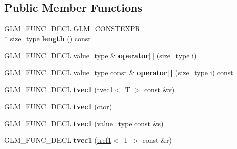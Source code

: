 \subsection*{Public Member Functions}
\begin{DoxyCompactItemize}
\item 
\hypertarget{structglm_1_1detail_1_1tvec1_a36558123300b2a66c51b62a17bee3657}{G\-L\-M\-\_\-\-F\-U\-N\-C\-\_\-\-D\-E\-C\-L G\-L\-M\-\_\-\-C\-O\-N\-S\-T\-E\-X\-P\-R \\*
size\-\_\-type {\bfseries length} () const }\label{structglm_1_1detail_1_1tvec1_a36558123300b2a66c51b62a17bee3657}

\item 
\hypertarget{structglm_1_1detail_1_1tvec1_a20e586dbb0fdfd345c66250a776b1246}{G\-L\-M\-\_\-\-F\-U\-N\-C\-\_\-\-D\-E\-C\-L value\-\_\-type \& {\bfseries operator\mbox{[}$\,$\mbox{]}} (size\-\_\-type i)}\label{structglm_1_1detail_1_1tvec1_a20e586dbb0fdfd345c66250a776b1246}

\item 
\hypertarget{structglm_1_1detail_1_1tvec1_ad8458f51c2f212caf4f1a66ca507514b}{G\-L\-M\-\_\-\-F\-U\-N\-C\-\_\-\-D\-E\-C\-L value\-\_\-type const \& {\bfseries operator\mbox{[}$\,$\mbox{]}} (size\-\_\-type i) const }\label{structglm_1_1detail_1_1tvec1_ad8458f51c2f212caf4f1a66ca507514b}

\item 
\hypertarget{structglm_1_1detail_1_1tvec1_a223f0b0626a866f6d6eff1110623a20d}{G\-L\-M\-\_\-\-F\-U\-N\-C\-\_\-\-D\-E\-C\-L {\bfseries tvec1} (\hyperlink{structglm_1_1detail_1_1tvec1}{tvec1}$<$ T $>$ const \&v)}\label{structglm_1_1detail_1_1tvec1_a223f0b0626a866f6d6eff1110623a20d}

\item 
\hypertarget{structglm_1_1detail_1_1tvec1_a6a152450aeaad0f0f87e5bc3f8b0bf84}{G\-L\-M\-\_\-\-F\-U\-N\-C\-\_\-\-D\-E\-C\-L {\bfseries tvec1} (ctor)}\label{structglm_1_1detail_1_1tvec1_a6a152450aeaad0f0f87e5bc3f8b0bf84}

\item 
\hypertarget{structglm_1_1detail_1_1tvec1_a4ad3cf1387e53c9b86958ffca9010b57}{G\-L\-M\-\_\-\-F\-U\-N\-C\-\_\-\-D\-E\-C\-L {\bfseries tvec1} (value\-\_\-type const \&s)}\label{structglm_1_1detail_1_1tvec1_a4ad3cf1387e53c9b86958ffca9010b57}

\item 
\hypertarget{structglm_1_1detail_1_1tvec1_a3520e427bc4946bb1b38b9727dcc5d8f}{G\-L\-M\-\_\-\-F\-U\-N\-C\-\_\-\-D\-E\-C\-L {\bfseries tvec1} (\hyperlink{structglm_1_1detail_1_1tref1}{tref1}$<$ T $>$ const \&r)}\label{structglm_1_1detail_1_1tvec1_a3520e427bc4946bb1b38b9727dcc5d8f}


\end{DoxyCompactItemize}
